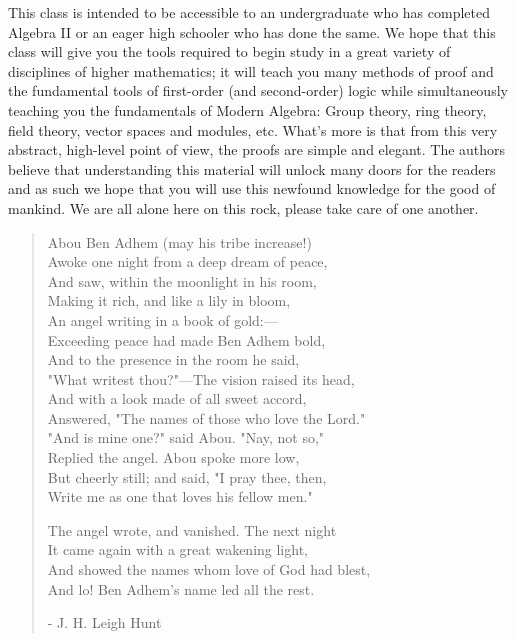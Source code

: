 This class is intended to be accessible to an undergraduate who has completed Algebra II or an eager high schooler who has done the same. We hope that this class will give you the tools required to begin study in a great variety of disciplines of higher mathematics; it will teach you many methods of proof and the fundamental tools of first-order (and second-order) logic while simultaneously teaching you the fundamentals of Modern Algebra: Group theory, ring theory, field theory, vector spaces and modules, etc. What's more is that from this very abstract, high-level point of view, the proofs are simple and elegant. 
\noindent The authors believe that understanding this material will unlock many doors for the readers and as such we hope that you will use this newfound knowledge for the good of mankind. We are all alone here on this rock, please take care of one another.\steezybreak
\small
\begin{quote}
Abou Ben Adhem (may his tribe increase!)\\
Awoke one night from a deep dream of peace,\\
And saw, within the moonlight in his room,\\
Making it rich, and like a lily in bloom,\\
An angel writing in a book of gold:—\\
Exceeding peace had made Ben Adhem bold,\\
And to the presence in the room he said,\\
"What writest thou?"—The vision raised its head,\\
And with a look made of all sweet accord,\\
Answered, "The names of those who love the Lord."\\
"And is mine one?" said Abou. "Nay, not so,"\\
Replied the angel. Abou spoke more low,\\
But cheerly still; and said, "I pray thee, then,\\
Write me as one that loves his fellow men."\steezybreak

The angel wrote, and vanished. The next night\\
It came again with a great wakening light,\\
And showed the names whom love of God had blest,\\
And lo! Ben Adhem's name led all the rest.\steezybreak

- J. H. Leigh Hunt
\end{quote} 

